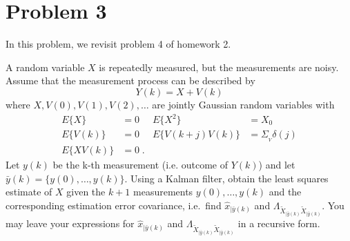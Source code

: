 \section*{Problem 3}

In this problem, we revisit problem 4 of homework 2.

A random variable $X$ is repeatedly measured, but the measurements are noisy.  Assume that the measurement process can be described by
\begin{equation*}
    Y(k) = X + V(k)
\end{equation*}
where $X, V(0), V(1), V(2), \ldots$ are jointly Gaussian random variables with
\begin{align*}
    E \{ X \} & = 0
        & E \{ X^2 \} & = X_0 \\
    E \{ V(k) \} & = 0
        & E \{ V(k+j) V(k) \} & = \Sigma_{_{V}} \delta(j) \\
    E \{ X V(k) \} & = 0 \; .
\end{align*}
Let $y(k)$ be the k-th measurement (i.e. outcome of $Y(k)$) and let $\bar{y}(k) = \{ y(0),\ldots,y(k) \}$. Using a Kalman filter, obtain the least squares estimate of $X$ given the $k+1$ measurements $y(0), \ldots, y(k)$ and the corresponding estimation error covariance, i.e.\ find $\hat{x}_{|\bar{y}(k)}$ and $\Lambda_{\tilde{X}_{|\bar{y}(k)} \tilde{X}_{|\bar{y}(k)}}$. You may leave your expressions for $\hat{x}_{|\bar{y}(k)}$ and $\Lambda_{\tilde{X}_{|\bar{y}(k)} \tilde{X}_{|\bar{y}(k)}}$ in a recursive form.


